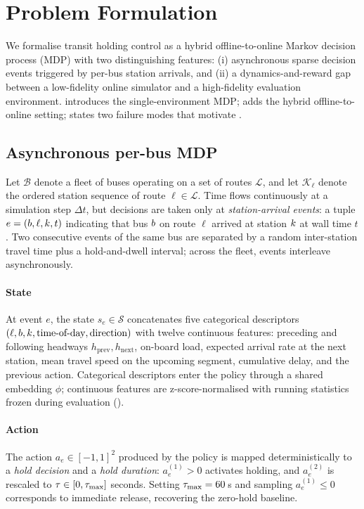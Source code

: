 \section{Problem Formulation}
\label{sec:problem}

We formalise transit holding control as a hybrid offline-to-online Markov decision process (MDP) with two distinguishing features: (i) asynchronous sparse decision events triggered by per-bus station arrivals, and (ii) a dynamics-and-reward gap between a low-fidelity online simulator and a high-fidelity evaluation environment.
 introduces the single-environment MDP;  adds the hybrid offline-to-online setting;  states two failure modes that motivate .

\subsection{Asynchronous per-bus MDP}
\label{sec:problem:mdp}

Let $\mathcal{B}$ denote a fleet of buses operating on a set of routes $\mathcal{L}$, and let $\mathcal{K}_\ell$ denote the ordered station sequence of route $\ell \in \mathcal{L}$.
Time flows continuously at a simulation step $\Delta t$, but decisions are taken only at \emph{station-arrival events}: a tuple $e = (b, \ell, k, t)$ indicating that bus $b$ on route $\ell$ arrived at station $k$ at wall time $t$.
Two consecutive events of the same bus are separated by a random inter-station travel time plus a hold-and-dwell interval; across the fleet, events interleave asynchronously.

\paragraph{State}
At event $e$, the state $s_e \in \mathcal{S}$ concatenates five categorical descriptors $(\ell, b, k, \text{time-of-day}, \text{direction})$ with twelve continuous features: preceding and following headways $h_{\text{prev}}, h_{\text{next}}$, on-board load, expected arrival rate at the next station, mean travel speed on the upcoming segment, cumulative delay, and the previous action.
Categorical descriptors enter the policy through a shared embedding $\phi$; continuous features are z-score-normalised with running statistics frozen during evaluation ().

\paragraph{Action}
The action $a_e \in [-1, 1]^2$ produced by the policy is mapped deterministically to a \emph{hold decision} and a \emph{hold duration}: $a_e^{(1)} > 0$ activates holding, and $a_e^{(2)}$ is rescaled to $\tau \in [0, \tau_{\max}]$ seconds.
Setting $\tau_{\max} = 60$\,s and sampling $a_e^{(1)} \le 0$ corresponds to immediate release, recovering the zero-hold baseline.

